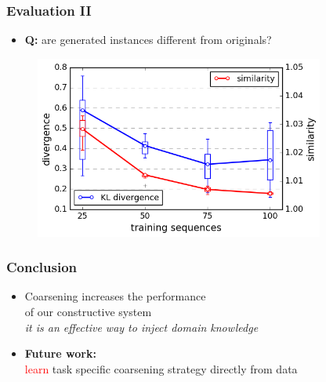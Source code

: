 \documentclass{beamer}
\newcommand{\red}[1]{\textcolor{red}{#1}}
\begin{document}
\begin{frame}
    \frametitle{Evaluation II}
    
    \begin{itemize}
        \item {\bf Q:} are generated instances different from originals?
    \end{itemize}
   \begin{figure}[ht]
        \centering
        \includegraphics[width=0.85\textwidth]{images/learningcurve.png}
    \end{figure}
\end{frame}

\begin{frame}
    \frametitle{Conclusion}
    
    \begin{itemize}
        \item Coarsening increases the performance\\ of our constructive system\\
        {\em it is an effective way to inject domain knowledge }
        \item {\bf Future work:} \\\red{learn} task specific coarsening strategy directly from data   
    \end{itemize}

\end{frame}
\end{document}
